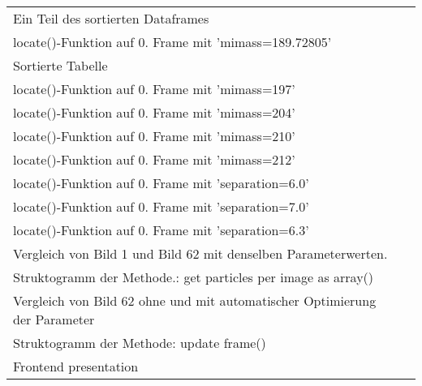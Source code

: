 \begin{tabularx}{\textwidth}{Xr}
Ein Teil des sortierten Dataframes \dotfill  &   \pageref{fig:kap3_halbsortDataframes}\\

locate()-Funktion auf 0. Frame mit ’mimass=189.72805’ \dotfill  &  \pageref{fig:kap3_m=189}\\

Sortierte Tabelle \dotfill  &   \pageref{fig:kap3_sortDataframes}\\

locate()-Funktion auf 0. Frame mit ’mimass=197’ \dotfill  &  \pageref{fig:kap3_m=197}\\

locate()-Funktion auf 0. Frame mit ’mimass=204’ \dotfill  &  \pageref{fig:kap3_m=204}\\

locate()-Funktion auf 0. Frame mit ’mimass=210’ \dotfill  &   \pageref{fig:kap3_m=210}\\

locate()-Funktion auf 0. Frame mit ’mimass=212’ \dotfill  &   \pageref{fig:kap3_m=212}\\

locate()-Funktion auf 0. Frame mit ’separation=6.0’ \dotfill  &   \pageref{fig:kap3_sep=6}\\

locate()-Funktion auf 0. Frame mit ’separation=7.0’ \dotfill  &   \pageref{fig:kap3_sep=7}\\

locate()-Funktion auf 0. Frame mit ’separation=6.3’ \dotfill  &   \pageref{fig:kap3_sep=6.3}\\

Vergleich von Bild 1 und Bild 62 mit denselben Parameterwerten. \dotfill  &   \pageref{fig:kap3_comp_Bild_1vs_62}\\

Struktogramm der Methode.: get particles per image as array() \dotfill  &   \pageref{fig:kap3_strukto_part_per_array}\\

Vergleich von Bild 62 ohne und mit automatischer Optimierung der Parameter \dotfill  &   \pageref{fig:kap3_vergleich_Bild_62_mit_ohne}\\

Struktogramm der Methode: update frame() \dotfill & \pageref{fig:kap3_strukto_update_frame}\\

Frontend presentation \dotfill  &   \pageref{fig:kap_App/GUI presentation}\\
\end{tabularx}
